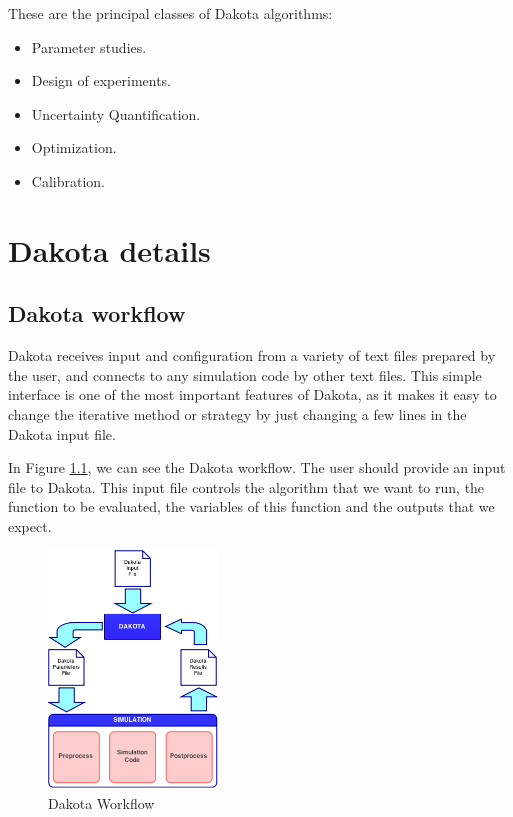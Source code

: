\documentclass[12pt,a4paper,article]{memoir} %
\begin{document}
These are the principal classes of Dakota algorithms:

\begin{itemize}
\item Parameter studies.
\item Design of experiments.
\item Uncertainty Quantification.
\item Optimization.
\item Calibration.
\end{itemize}

\chapter{Dakota details}

\section{Dakota workflow}

Dakota receives input and configuration from a variety of text files prepared by the user, and connects to any simulation code by other text files. This simple interface is one of the most important features of Dakota, as it makes it easy to change the iterative method or strategy by just changing a few lines in the Dakota input file.

In Figure \ref{fig:Workflow}, we can see the Dakota workflow. The user should provide an input file to Dakota. This input file controls the algorithm that we want to run, the function to be evaluated, the variables of this function and the outputs that we expect.

\begin{figure}[htb!]
  \centering
    \includegraphics[width=0.4\textwidth]{DakotaWorkflow}
  \caption{Dakota Workflow}
  \label{fig:Workflow}
\end{figure}
\end{document}
